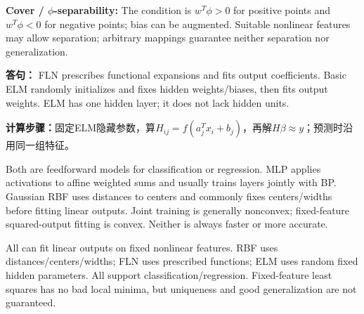 \textbf{Cover / $\phi$-separability:} The condition is $w^T\phi>0$ for positive points and $w^T\phi<0$ for negative points; bias can be augmented. Suitable nonlinear features may allow separation; arbitrary mappings guarantee neither separation nor generalization.

\textbf{答句：} FLN prescribes functional expansions and fits output coefficients. Basic ELM randomly initializes and fixes hidden weights/biases, then fits output weights. ELM has one hidden layer; it does not lack hidden units.

\textbf{计算步骤：}固定ELM隐藏参数，算$H_{ij}=f(a_j^Tx_i+b_j)$，再解$H\beta\approx y$；预测时沿用同一组特征。



Both are feedforward models for classification or regression. MLP applies activations to affine weighted sums and usually trains layers jointly with BP. Gaussian RBF uses distances to centers and commonly fixes centers/widths before fitting linear outputs. Joint training is generally nonconvex; fixed-feature squared-output fitting is convex. Neither is always faster or more accurate.

All can fit linear outputs on fixed nonlinear features. RBF uses distances/centers/widths; FLN uses prescribed functions; ELM uses random fixed hidden parameters. All support classification/regression. Fixed-feature least squares has no bad local minima, but uniqueness and good generalization are not guaranteed.
\columnend
